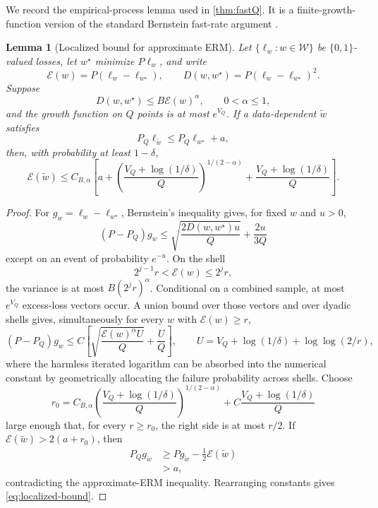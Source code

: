 \documentclass[11pt]{article}
\newtheorem{lemma}[theorem]{Lemma}
\newcommand{\calW}{\mathcal W}
\begin{document}
We record the empirical-process lemma used in \cref{thm:fastQ}.  It is a finite-growth-function version of the standard Bernstein fast-rate argument \citep{MassartNedelec}.

\begin{lemma}[Localized bound for approximate ERM]
\label{lem:localized}
Let $\{\ell_w:w\in\calW\}$ be $\{0,1\}$-valued losses, let $w^\star$ minimize $P\ell_w$, and write
\[
\mathcal E(w)=P(\ell_w-\ell_{w^\star}),
\qquad
D(w,w^\star)=P(\ell_w-\ell_{w^\star})^2.
\]
Suppose
\[
D(w,w^\star)\le B\mathcal E(w)^\alpha,
\qquad 0<\alpha\le1,
\]
and the growth function on $Q$ points is at most $e^{V_Q}$.  If a data-dependent $\widetilde w$ satisfies
\[
P_Q\ell_{\widetilde w}
\le
P_Q\ell_{w^\star}+a,
\]
then, with probability at least $1-\delta$,
\begin{equation}
\label{eq:localized-bound}
\mathcal E(\widetilde w)
\le
C_{B,\alpha}
\left[
 a
+
\left(\frac{V_Q+\log(1/\delta)}{Q}\right)^{1/(2-\alpha)}
+
\frac{V_Q+\log(1/\delta)}{Q}
\right].
\end{equation}
\end{lemma}

\begin{proof}
For $g_w=\ell_w-\ell_{w^\star}$, Bernstein's inequality gives, for fixed $w$ and $u>0$,
\[
(P-P_Q)g_w
\le
\sqrt{\frac{2D(w,w^\star)u}{Q}}
+
\frac{2u}{3Q}
\]
except on an event of probability $e^{-u}$.  On the shell
\[
2^{j-1}r<\mathcal E(w)\le2^jr,
\]
the variance is at most $B(2^jr)^\alpha$.  Conditional on a combined sample, at most $e^{V_Q}$ excess-loss vectors occur.  A union bound over those vectors and over dyadic shells gives, simultaneously for every $w$ with $\mathcal E(w)\ge r$,
\[
(P-P_Q)g_w
\le
C\left[
\sqrt{\frac{\mathcal E(w)^\alpha U}{Q}}
+
\frac{U}{Q}
\right],
\qquad
U=V_Q+\log(1/\delta)+\log\log(2/r),
\]
where the harmless iterated logarithm can be absorbed into the numerical constant by geometrically allocating the failure probability across shells.  Choose
\[
r_0=C_{B,\alpha}
\left(\frac{V_Q+\log(1/\delta)}{Q}\right)^{1/(2-\alpha)}
+C\frac{V_Q+\log(1/\delta)}{Q}
\]
large enough that, for every $r\ge r_0$, the right side is at most $r/2$.  If $\mathcal E(\widetilde w)>2(a+r_0)$, then
\begin{align*}
P_Qg_{\widetilde w}
&\ge
Pg_{\widetilde w}-\frac12\mathcal E(\widetilde w)\\
&>
a,
\end{align*}
contradicting the approximate-ERM inequality.  Rearranging constants gives \eqref{eq:localized-bound}.
\end{proof}
\end{document}
